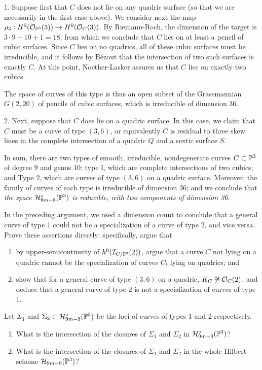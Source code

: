 1. Suppose first that $C$ does not lie on any quadric surface (so that we are necessarily in the first case above). We consider next the map $\rho_3 : H^0({\mathcal O}_{{\mathbb P}^3}(3)) \to H^0({\mathcal O}_C(3))$. By Riemann-Roch, the dimension of the target is $3\cdot 9 - 10 + 1 = 18$, from which we conclude that $C$ lies on at least a pencil of cubic surfaces. Since $C$ lies on no quadrics, all of these cubic surfaces must be irreducible, and it follows by B\'ezout that the intersection of two such surfaces is exactly $C$. At this point, Noether-Lasker assures us that $C$ lies on exactly two cubics.

The space of curves of this type is thus an open subset of the Grassmannian $G(2,20)$ of pencils of cubic surfaces, which is irreducible of dimension 36.

2. Next, suppose that $C$ does lie on a quadric surface. In this case, we claim that $C$ must be a curve of type $(3,6)$, or equivalently $C$ is residual to three skew lines in the complete intersection of a quadric $Q$ and a sextic surface $S$.

In sum, there are two types of smooth, irreducible, nondegenerate curves $C \subset {\mathbb P}^3$ of degree 9 and genus 10: type I, which are complete intersections of two cubics; and Type 2, which are curves of type $(3,6)$ on a quadric surface. Moreover, the family of curves of each type is irreducible of dimension 36; and we conclude that \emph{the space ${\cal H}^\circ_{8m-8}({\mathbb P}^3)$ is reducible, with two components of dimension 36}.


\begin{exercise}
In the preceding argument, we used a dimension count to conclude that a general curve of type 1 could not be a specialization of a curve of type 2, and vice versa. Prove these assertions directly: specifically, argue that
\begin{enumerate}
\item by upper-semicontinuity of $h^0({\mathcal I}_{C/{\mathbb P}^3}(2))$, argue that a curve $C$ not lying on a quadric cannot be the specialization of curves $C_t$ lying on quadrics; and
\item show that for a general curve of type $(3,6)$ on a quadric, $K_C \not\cong {\mathcal O}_C(2)$, and deduce that a general curve of type 2 is not a specialization of curves of type 1.
\end{enumerate}
\end{exercise}

\begin{exercise}
Let $\Sigma_1$ and $\Sigma_2 \subset {\cal H}^\circ_{9m-9}({\mathbb P}^3)$ be the loci of curves of types 1 and 2 respectively. 
\begin{enumerate}
\item What is the intersection of the closures of $\Sigma_1$ and $\Sigma_2$ in ${\cal H}^\circ_{9m-9}({\mathbb P}^3)$?
\item What is the intersection of the closures of $\Sigma_1$ and $\Sigma_2$ in the whole Hilbert scheme ${\cal H}_{9m-9}({\mathbb P}^3)$?
\end{enumerate}
\end{exercise}

